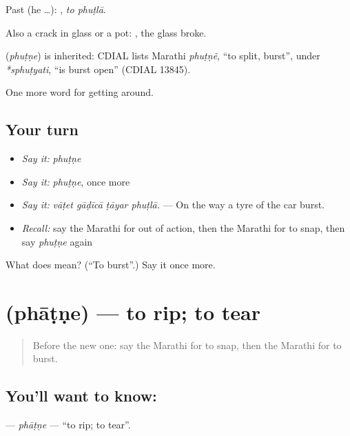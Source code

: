Past (he …):  , \emph{to phuṭlā}.

Also a crack in glass or a pot:  , the glass broke.

\begin{cousinweb}
\textbf{} (\emph{phuṭṇe}) is inherited: CDIAL lists Marathi \emph{phuṭṇẽ}, \textquotedblleft{}to split, burst\textquotedblright{}, under \emph{*sphuṭyati}, \textquotedblleft{}is burst open\textquotedblright{} (CDIAL 13845).
\end{cousinweb}

\begin{grammarlens}[title={What you've built}]
One more word for getting around.
\end{grammarlens}

\subsection*{Your turn}
\begin{itemize}
\raggedright
  \item \emph{Say it:} \emph{phuṭṇe}
  \item \emph{Say it:} \emph{phuṭṇe}, once more
  \item \emph{Say it:} \emph{vāṭet gāḍīcā ṭāyar phuṭlā.} — On the way a tyre of the car burst.
  \item \emph{Recall:} say the Marathi for out of action, then the Marathi for to snap, then say \emph{phuṭṇe} again
\end{itemize}

\begin{tcolorbox}[breakable,colback=teal!4,colframe=teal!35!black,title={Before you move on}]
What does  mean? (\textquotedblleft{}To burst\textquotedblright{}.) Say it once more.
\end{tcolorbox}
\section[\texorpdfstring{\mr{फाटणे} (phāṭṇe)}{फाटणे (phāṭṇe)}]{ (phāṭṇe) — to rip; to tear}

\label{lesson:MR-C431-phatne}



\begin{quote}
Before the new one: say the Marathi for to snap, then the Marathi for to burst.
\end{quote}

\subsection*{You'll want to know: }
\textbf{} — \emph{phāṭṇe} — \textquotedblleft{}to rip; to tear\textquotedblright{}.

